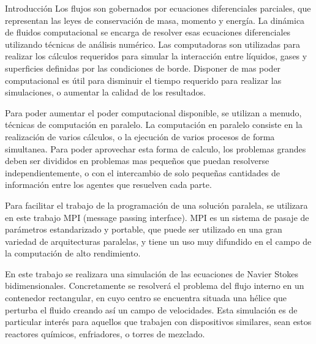 \begin{section}{Introducción}
Los flujos son gobernados por ecuaciones diferenciales parciales, que representan las leyes de conservación de masa, momento y energía. La dinámica de fluidos computacional se encarga de resolver esas ecuaciones diferenciales utilizando técnicas de análisis numérico. Las computadoras son utilizadas para realizar los cálculos requeridos para simular la interacción entre líquidos, gases y superficies definidas por las condiciones de borde. Disponer de mas poder computacional es útil para disminuir el tiempo requerido para realizar las simulaciones, o aumentar la calidad de los resultados.

Para poder aumentar el poder computacional disponible, se utilizan a menudo, técnicas de computación en paralelo. La computación en paralelo consiste en la realización de varios cálculos, o la ejecución de varios procesos de forma simultanea. Para poder aprovechar esta forma de calculo, los problemas grandes deben ser divididos en problemas mas pequeños que puedan resolverse independientemente, o con el intercambio de solo pequeñas cantidades de información entre los agentes que resuelven cada parte.

Para facilitar el trabajo de la programación de una solución paralela, se utilizara en este trabajo MPI (message passing interface). MPI es un sistema de pasaje de parámetros estandarizado y portable, que puede ser utilizado en una gran variedad de arquitecturas paralelas, y tiene un uso muy difundido en el campo de la computación de alto rendimiento. 

En este trabajo se realizara una simulación de las ecuaciones de Navier Stokes bidimensionales. Concretamente se resolverá el problema del flujo interno en un contenedor rectangular, en cuyo centro se encuentra situada una hélice que perturba el fluido creando así un campo de velocidades. Esta simulación es de particular interés para aquellos que trabajen con dispositivos similares, sean estos reactores químicos, enfriadores, o torres de mezclado. 

\end{section}


